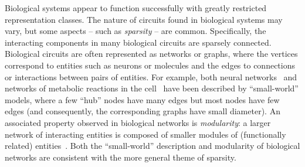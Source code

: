 Biological systems appear to function successfully with greatly restricted
representation classes. The nature of circuits found in biological systems may
vary, but some aspects -- such as \emph{sparsity} -- are common.  Specifically,
the interacting components in many biological circuits are sparsely connected.
Biological circuits are often represented as networks or graphs, where the
vertices correspond to entities such as neurons or molecules and the edges to
connections or interactions between pairs of entities. For example, both neural
networks~\cite{Watts:1998} and networks of metabolic reactions in the
cell~\cite{Wagner:2001,Barabasi:2000} have been described by ``small-world''
models, where a few ``hub'' nodes have many edges but most nodes have few edges
(and consequently, the corresponding graphs have small diameter).  An associated
property observed in biological networks is \emph{modularity}: a larger network
of interacting entities is composed of smaller modules of (functionally related)
entities~\cite{Hartwell:1999}.  Both the ``small-world'' description and
modularity of biological networks are consistent with the more general theme of
sparsity.

